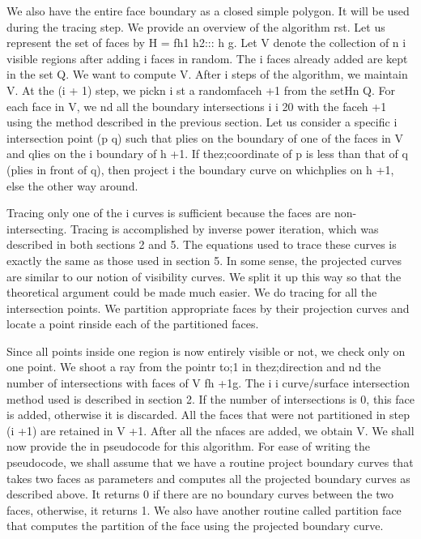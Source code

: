 \documentclass[11pt,letterpaper]{article}
\begin{document}
We also have the entire face boundary as a closed simple polygon. It will be used during the tracing step. We provide an overview of the algorithm rst. Let us represent the set of faces by H = fh1 h2::: h g. Let V denote the collection of n i visible regions after adding i faces in random. The i faces already added are kept in the set Q. We want to compute V. After i steps of the algorithm, we maintain V. At the (i + 1) step, we pickn i st a randomfaceh +1 from the setHn Q. For each face in V, we nd all the boundary intersections i i 20 with the faceh +1 using the method described in the previous section. Let us consider a specific i intersection point (p q) such that plies on the boundary of one of the faces in V and qlies on the i boundary of h +1. If thez;coordinate of p is less than that of q (plies in front of q), then project i the boundary curve on whichplies on h +1, else the other way around.

Tracing only one of the i curves is sufficient because the faces are non-intersecting. Tracing is accomplished by inverse power iteration, which was described in both sections 2 and 5. The equations used to trace these curves is exactly the same as those used in section 5. In some sense, the projected curves are similar to our notion of visibility curves. We split it up this way so that the theoretical argument could be made much easier. We do tracing for all the intersection points. We partition appropriate faces by their projection curves and locate a point rinside each of the partitioned faces.

Since all points inside one region is now entirely visible or not, we check only on one point. We shoot a ray from the pointr to;1 in thez;direction and nd the number of intersections with faces of V fh +1g. The i i curve/surface intersection method used is described in section 2. If the number of intersections is 0, this face is added, otherwise it is discarded. All the faces that were not partitioned in step (i +1) are retained in V +1. After all the nfaces are added, we obtain V. We shall now provide the in pseudocode for this algorithm. For ease of writing the pseudocode, we shall assume that we have a routine project boundary curves that takes two faces as parameters and computes all the projected boundary curves as described above. It returns 0 if there are no boundary curves between the two faces, otherwise, it returns 1. We also have another routine called partition face that computes the partition of the face using the projected boundary curve.
\end{document}
